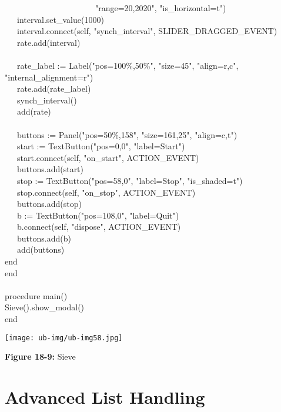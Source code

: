 {\>   \ \ \ \ \ \ \ \ \ \ \ \ \ \ \ \ \ \ \ \ \ \ "range=20,2020", "is\_horizontal=t") \\
\>   \ \ \ interval.set\_value(1000) \\
\>   \ \ \ interval.connect(self,
"synch\_interval", SLIDER\_DRAGGED\_EVENT) \\
\>   \ \ \ rate.add(interval) \\
\ \\
\>   \ \ \ rate\_label := Label("pos=100\%,50\%", "size=45", "align=r,c", \\
\>\>\>\>"internal\_alignment=r") \\
\>   \ \ \ rate.add(rate\_label) \\
\>   \ \ \ synch\_interval() \\
\>   \ \ \ add(rate) \\
\ \\
\>   \ \ \ buttons := Panel("pos=50\%,158",
"size=161,25",
"align=c,t") \\
\>   \ \ \ start := TextButton("pos=0,0",
"label=Start") \\
\>   \ \ \ start.connect(self, "on\_start",
ACTION\_EVENT) \\
\>   \ \ \ buttons.add(start) \\
\>   \ \ \ stop := TextButton("pos=58,0",
"label=Stop",
"is\_shaded=t") \\
\>   \ \ \ stop.connect(self, "on\_stop",
ACTION\_EVENT) \\
\>   \ \ \ buttons.add(stop) \\
\>   \ \ \ b := TextButton("pos=108,0",
"label=Quit") \\
\>   \ \ \ b.connect(self, "dispose",
ACTION\_EVENT) \\
\>   \ \ \ buttons.add(b) \\
\>   \ \ \ add(buttons) \\
\>   end \\
end \\
\ \\
procedure main() \\
\>   Sieve().show\_modal() \\
end
}

\bigskip

\begin{center}
\texttt{[image: ub-img/ub-img58.jpg]}
\end{center}

{\sffamily\bfseries Figure 18-9:}
{\sffamily Sieve}

\section{Advanced List Handling}

